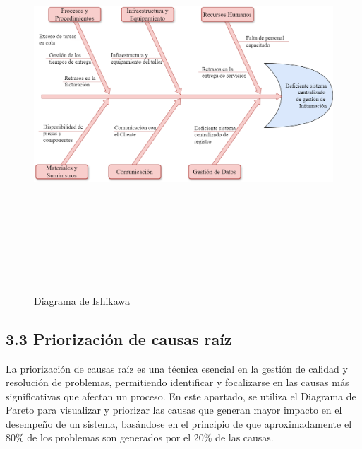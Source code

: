 \begin{landscape}
    \begin{figure}[h]
        \centering
        \caption[Diagrama de Ishikawa]{Diagrama de Ishikawa}
        \includegraphics[width=20cm, height=14cm]{imagenes/cap3/IshikawaPescado.drawio.png}
        \label{fig:ishikawa}
    \end{figure}
\end{landscape}

\subsection{3.3 Priorización de causas raíz}
La priorización de causas raíz es una técnica esencial en la gestión de calidad y resolución de problemas, permitiendo identificar y focalizarse en las causas más significativas que afectan un proceso. En este apartado, se utiliza el Diagrama de Pareto para visualizar y priorizar las causas que generan mayor impacto en el desempeño de un sistema, basándose en el principio de que aproximadamente el 80\% de los problemas son generados por el 20\% de las causas.

